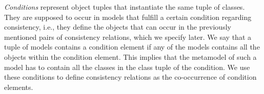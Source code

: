\emph{Conditions} represent object tuples that instantiate the same tuple of classes. They are supposed to occur in models that fulfill a certain condition regarding consistency, i.e., they define the objects that can occur in the previously mentioned pairs of consistency relations, which we specify later.
We say that a tuple of models contains a condition element if any of the models contains all the objects within the condition element. %
This implies that the metamodel of such a model has to contain all the classes in the class tuple of the condition.
We use these conditions to define consistency relations as the co-occurrence of condition elements.

